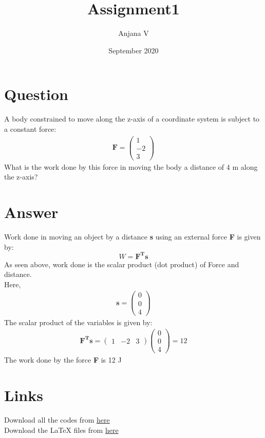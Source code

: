 \documentclass{article}
\title{Assignment1}
\author{Anjana V }
\date{September 2020}
\begin{document}
\newcommand{\myvec}[1]{\ensuremath{\begin{pmatrix}#1\end{pmatrix}}}
\maketitle
\section*{Question}
A body constrained to move along the z-axis of a coordinate system is subject to a constant force:
\begin{align*}
\textbf{F}=\myvec{1\\-2\\3}    
\end{align*}
What is the work done by this force in moving the body a distance of 4 m along the z-axis?
\section*{Answer}
Work done in moving an object by a distance \textbf{s} using an external force \textbf{F} is given by:
$$W = \mathbf{F^Ts}$$
As seen above, work done is the scalar product (dot product) of Force and distance.
\\Here, 
\begin{align*}
\textbf{s}=\myvec{0\\0\\4}   
\end{align*}
The scalar product of the variables is given by:
\begin{align*}
\mathbf{F^Ts} = \myvec{1 & -2 & 3} \myvec{0\\0\\4} = 12
\end{align*}
The work done by the force \textbf{F} is 12 J
\section*{Links}
Download all the codes from \href{https://github.com/anjanavasudevan/grad_schoolwork/blob/master/EE5609/Assignment1/assignment.py}{here} 
\\Download the LaTeX files from \href{https://github.com/anjanavasudevan/grad_schoolwork/tree/master/EE5609/Assignment1/latex}{here}
\end{document}
